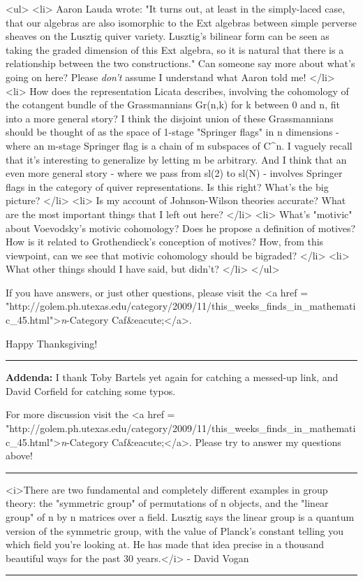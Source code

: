 <ul>
<li>
Aaron Lauda wrote: "It turns out, at least in the simply-laced case,
that our algebras are also isomorphic to the Ext algebras between
simple perverse sheaves on the Lusztig quiver variety.  Lusztig's
bilinear form can be seen as taking the graded dimension of this Ext
algebra, so it is natural that there is a relationship between the two
constructions."  Can someone say more about what's going on here?
Please \emph{don't} assume I understand what Aaron told me!
</li>
<li>
How does the representation Licata describes, involving the cohomology
of the cotangent bundle of the Grassmannians Gr(n,k) for k between 0
and n, fit into a more general story?  I think the disjoint union of
these Grassmannians should be thought of as the space of 1-stage
"Springer flags" in n dimensions - where an m-stage Springer flag is a
chain of m subspaces of C^{n}.  I vaguely recall that it's
interesting to generalize by letting m be arbitrary.  And I think that
an even more general story - where we pass from sl(2) to sl(N) -
involves Springer flags in the category of quiver representations.  Is
this right?  What's the big picture?
</li>
<li>
Is my account of Johnson-Wilson theories accurate?  What are the most 
important things that I left out here?
</li>
<li>
What's "motivic" about Voevodsky's motivic cohomology?  Does he propose a 
definition of motives?  How is it related to Grothendieck's conception of 
motives?  How, from this viewpoint, can we see that motivic cohomology 
should be bigraded?
</li>
<li>
What other things should I have said, but didn't?
</li>
</ul>

If you have answers, or just other questions, please visit
the <a href = "http://golem.ph.utexas.edu/category/2009/11/this_weeks_finds_in_mathematic_45.html">\emph{n}-Category
Caf&eacute;</a>.  

Happy Thanksgiving!

\par\noindent\rule{\textwidth}{0.4pt}

\textbf{Addenda:} I thank Toby Bartels yet again for catching a
messed-up link, and David Corfield for catching some typos.

For more discussion visit the <a href =
"http://golem.ph.utexas.edu/category/2009/11/this_weeks_finds_in_mathematic_45.html">\emph{n}-Category
Caf&eacute;</a>.  Please try to answer my questions above!


\par\noindent\rule{\textwidth}{0.4pt}


<i>There are two fundamental and completely different examples in group
theory: the "symmetric group" of permutations of n objects, and the
"linear group" of n by n matrices over a field.  Lusztig says the
linear group is a quantum version of the symmetric group, with 
the value of Planck's constant
telling you which field you're looking at.  He has made that idea
precise in a thousand beautiful ways for the past 30 years.</i> - David Vogan
 
\par\noindent\rule{\textwidth}{0.4pt}

